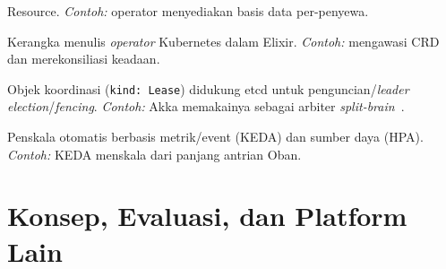 \begin{description}[style=nextline,leftmargin=1.4em]
{    Resource}. \emph{Contoh:} operator menyediakan basis data per-penyewa.
  \item[Bonny] Kerangka menulis \emph{operator} Kubernetes dalam Elixir. \emph{Contoh:}
    mengawasi CRD dan merekonsiliasi keadaan.
  \item[Kubernetes Lease] Objek koordinasi (\texttt{kind: Lease}) didukung etcd untuk
    penguncian/\emph{leader election}/\emph{fencing}. \emph{Contoh:} Akka memakainya sebagai
    arbiter \emph{split-brain}~\cite{akkaLease}.
  \item[KEDA / HPA] Penskala otomatis berbasis metrik/event (KEDA) dan sumber daya (HPA).
    \emph{Contoh:} KEDA menskala dari panjang antrian Oban.
\end{description}

\section{Konsep, Evaluasi, dan Platform Lain}
